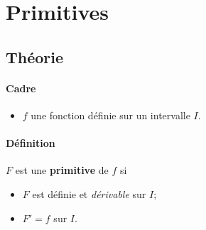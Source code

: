 \documentclass[main.tex]{subfiles}
\begin{document}
\chapter{Primitives}

\section{Théorie}

\begin{definition}
    [Primitive]

    \subsubsection{Cadre}
    \begin{itemize}
        \item $f$ une fonction définie sur un intervalle $I$.
    \end{itemize}

    \subsubsection{Définition}
    $F$ est une \textbf{primitive} de $f$
    si
    \begin{itemize}
        \item $F$ est définie et \emph{dérivable} sur $I$;
        \item $F' = f$ sur $I$.
    \end{itemize}
\end{definition}
\end{document}
